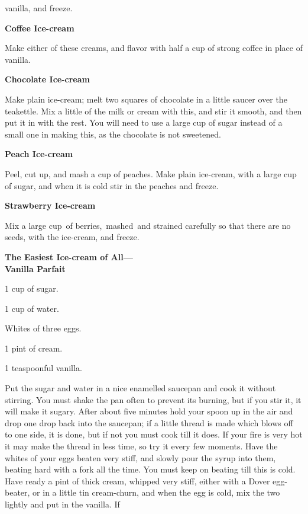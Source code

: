\documentclass[11pt]{book}
\newcommand{\indpar}{\par\noindent\hspace*{\parindent}}
\newcommand{\ingredient}{\indpar}
\newcommand{\instruction}{\indpar}
\newenvironment{RecipeTitle}{\medskip\begin{center}\large\bf }{\end{center}\smallskip}
\begin{document}
vanilla, and freeze.
\begin{RecipeTitle}
Coffee Ice-cream\label{coffee_ice_cream}
\end{RecipeTitle}
\instruction  Make either of these creams, and flavor with half a cup of
strong coffee in place of vanilla.
\begin{RecipeTitle}
Chocolate Ice-cream\label{chocolate_ice_cream}
\end{RecipeTitle}
\instruction Make plain ice-cream; melt two squares of chocolate in a
little saucer over the teakettle.  Mix a little of the milk or
cream with this, and stir it smooth, and then put it in with
the rest.  You will need to use a large cup of sugar instead
of a small one in making this, as the chocolate is not
sweetened.
\begin{RecipeTitle}
Peach Ice-cream\label{peach_ice_cream}
\end{RecipeTitle}
\instruction  Peel, cut up, and mash a cup of peaches.  Make plain
ice-cream, with a large cup of sugar, and when it is cold stir
in the peaches and freeze.
\begin{RecipeTitle}
Strawberry Ice-cream\label{strawberry_ice_cream}
\end{RecipeTitle}
\instruction  Mix a large cup\, of berries,\, mashed\, and strained carefully so
that there are no seeds, with the ice-cream, and freeze.
\begin{RecipeTitle}
The Easiest Ice-cream of All---\\
Vanilla Parfait\label{vanilla_parfait}
\end{RecipeTitle}
\ingredient  1 cup of sugar.
\ingredient  1 cup of water.
\ingredient  Whites of three eggs.
\ingredient  1 pint of cream.
\ingredient  1 teaspoonful vanilla.
\instruction  Put the sugar and water in a nice enamelled saucepan and
cook it without stirring.  You must shake the pan often to
prevent its burning, but if you stir it, it will make it
sugary.  After about five minutes hold your spoon up in the
air and drop one drop back into the saucepan; if a little
thread is made which blows off to one side, it is done, but
if not you must cook till it does.  If your fire is very hot
it may make the thread in less time, so try it every few
moments.  Have the whites of your eggs beaten very stiff, and
slowly pour the syrup into them, beating hard with a fork all
the time.  You must keep on beating till this is cold.  Have
ready a pint of thick cream, whipped very stiff, either with a
Dover egg-beater, or in a little tin cream-churn, and when the
egg is cold, mix the two lightly and put in the vanilla.  If
\end{document}
